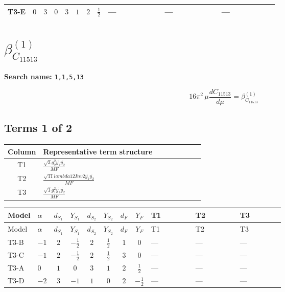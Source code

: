 \documentclass[8pt]{article}
\begin{document}
\begin{landscape}
\begin{longtable}{@{}llcccccc >{\raggedright\arraybackslash}p{0.21\linewidth} >{\raggedright\arraybackslash}p{0.21\linewidth} >{\raggedright\arraybackslash}p{0.21\linewidth}@{}}
\midrule
T3-E & $0$ & $3$ & $0$ & $3$ & $1$ & $2$ & $\frac{1}{2}$ & --- & --- & --- \\
\midrule
\bottomrule
\end{longtable}
\clearpage
\section*{$\beta_{C_{11513}}^{(1)}$}
\noindent\textbf{Search name: }\texttt{1,1,5,13}\par\smallskip
\[16\pi^2\,\mu\frac{d C_{11513}}{d\mu}=\beta_{C_{11513}}^{(1)}\]
\subsection*{Terms 1 of 2}
\begin{center}
\begin{tabular}{@{}c >{\raggedright\arraybackslash}p{0.82\linewidth}@{}}
\toprule
Column & Representative term structure \\
\midrule
T1 & \(\displaystyle \frac{\sqrt{3} g_{2}^{2} \overline{y_{1}} \overline{y_{2}}}{MF}\) \\
\midrule
T2 & \(\displaystyle \frac{\sqrt{11} lambda12Inv2 \overline{y_{1}} \overline{y_{2}}}{MF}\) \\
\midrule
T3 & \(\displaystyle \frac{\sqrt{3} g_{1}^{2} \overline{y_{1}} \overline{y_{2}}}{MF}\) \\
\midrule
\bottomrule
\end{tabular}
\end{center}
\smallskip
\tiny
\begin{longtable}{@{}llcccccc >{\raggedright\arraybackslash}p{0.21\linewidth} >{\raggedright\arraybackslash}p{0.21\linewidth} >{\raggedright\arraybackslash}p{0.21\linewidth}@{}}
\toprule
Model & $\alpha$ & $d_{S_1}$ & $Y_{S_1}$ & $d_{S_2}$ & $Y_{S_2}$ & $d_F$ & $Y_F$ & T1 & T2 & T3 \\
\midrule
\endfirsthead
\toprule
Model & $\alpha$ & $d_{S_1}$ & $Y_{S_1}$ & $d_{S_2}$ & $Y_{S_2}$ & $d_F$ & $Y_F$ & T1 & T2 & T3 \\
\midrule
\endhead
T3-B & $-1$ & $2$ & $-\frac{1}{2}$ & $2$ & $\frac{1}{2}$ & $1$ & $0$ & --- & --- & --- \\
\midrule
T3-C & $-1$ & $2$ & $-\frac{1}{2}$ & $2$ & $\frac{1}{2}$ & $3$ & $0$ & --- & --- & --- \\
\midrule
T3-A & $0$ & $1$ & $0$ & $3$ & $1$ & $2$ & $\frac{1}{2}$ & --- & --- & --- \\
\midrule
T3-D & $-2$ & $3$ & $-1$ & $1$ & $0$ & $2$ & $-\frac{1}{2}$ & --- & --- & --- \\

\end{longtable}
\end{landscape}
\end{document}
